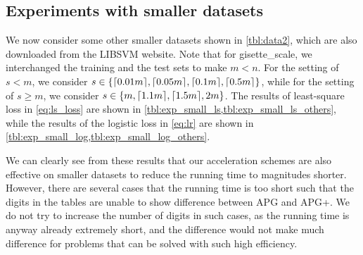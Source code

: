 \documentclass{article}
\newcommand{\Alert}[1]{{ #1}}
\theoremstyle{plain}
\theoremstyle{definition}
\theoremstyle{remark}
\newcommand*{\lmss}{\fontfamily{lmss}\selectfont}
\DeclarePairedDelimiter{\ceil}{\lceil}{\rceil}
\def\gisette{{\lmss gisette\_scale}\xspace}
\begin{document}
\subsection{Experiments with smaller datasets}
We now consider some other smaller datasets shown in \cref{tbl:data2},
which are also downloaded from the LIBSVM website.
Note that for \gisette, we interchanged the training and the test sets
to make $m < n$. For the setting of $s < m$, we consider $s \in \{
\ceil{0.01m},\ceil{0.05m},\ceil{0.1m},\ceil{0.5m}\}$,
while for the setting of $s \geq m$, we consider $s\in \{
m,\ceil{1.1m},\ceil{1.5m},2m\}$.
The results of least-square loss in \cref{eq:ls_loss} are shown in
\cref{tbl:exp_small_ls,tbl:exp_small_ls_others}, while the
results of the logistic loss in \cref{eq:lr} are shown in
\cref{tbl:exp_small_log,tbl:exp_small_log_others}.

We can clearly see from these results that our acceleration schemes
are also effective on smaller datasets to reduce the running time to
magnitudes shorter.
However, there are several cases that the running time is too short
such that the digits in the tables are unable to show difference
between APG and APG+.
We do not try to increase the number of digits in such cases, as the
running time is anyway already extremely short, and the difference
would not make much difference for problems that can be solved with
such high efficiency.
\end{document}
